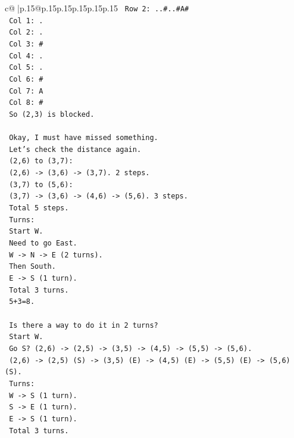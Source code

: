 \documentclass{article}
\begin{document}
{\begin{supertabular}{c@{$\;$}|p{.15\linewidth}@{}p{.15\linewidth}p{.15\linewidth}p{.15\linewidth}p{.15\linewidth}p{.15\linewidth}}
{{{\texttt{   Row 2: ..\#..\#A\#} \\
\texttt{   Col 1: .} \\
\texttt{   Col 2: .} \\
\texttt{   Col 3: \#} \\
\texttt{   Col 4: .} \\
\texttt{   Col 5: .} \\
\texttt{   Col 6: \#} \\
\texttt{   Col 7: A} \\
\texttt{   Col 8: \#} \\
\texttt{   So (2,3) is blocked.} \\
\\ 
\texttt{   Okay, I must have missed something.} \\
\texttt{   Let's check the distance again.} \\
\texttt{   (2,6) to (3,7):} \\
\texttt{   (2,6) {-}> (3,6) {-}> (3,7). 2 steps.} \\
\texttt{   (3,7) to (5,6):} \\
\texttt{   (3,7) {-}> (3,6) {-}> (4,6) {-}> (5,6). 3 steps.} \\
\texttt{   Total 5 steps.} \\
\texttt{   Turns:} \\
\texttt{   Start W.} \\
\texttt{   Need to go East.} \\
\texttt{   W {-}> N {-}> E (2 turns).} \\
\texttt{   Then South.} \\
\texttt{   E {-}> S (1 turn).} \\
\texttt{   Total 3 turns.} \\
\texttt{   5+3=8.} \\
\\ 
\texttt{   Is there a way to do it in 2 turns?} \\
\texttt{   Start W.} \\
\texttt{   Go S? (2,6) {-}> (2,5) {-}> (3,5) {-}> (4,5) {-}> (5,5) {-}> (5,6).} \\
\texttt{   (2,6) {-}> (2,5) (S) {-}> (3,5) (E) {-}> (4,5) (E) {-}> (5,5) (E) {-}> (5,6) (S).} \\
\texttt{   Turns:} \\
\texttt{   W {-}> S (1 turn).} \\
\texttt{   S {-}> E (1 turn).} \\
\texttt{   E {-}> S (1 turn).} \\
\texttt{   Total 3 turns.} \\
}}}
\end{supertabular}}
\end{document}
